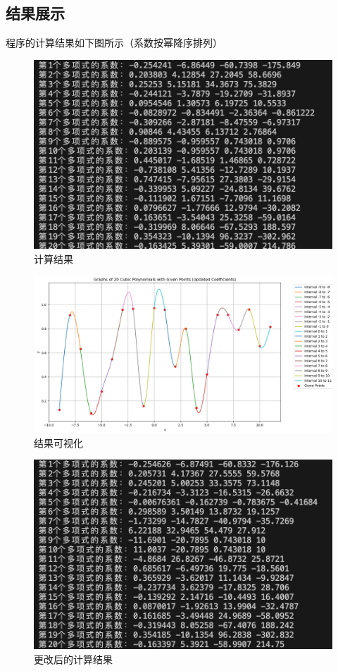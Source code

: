 \documentclass[UTF8]{ctexart}
\begin{document}
\subsection{结果展示}
程序的计算结果如下图所示（系数按幂降序排列）
\begin{figure}[H]
  \centering
  \includegraphics[scale=0.5]{res1.png}
  \caption{计算结果}
\end{figure}
\begin{figure}[H]
  \centering
  \includegraphics[scale=0.3]{Figure_1.png}
  \caption{结果可视化}
\end{figure}
\begin{figure}[H]
  \centering
  \includegraphics[scale=0.5]{res2.png}
  \caption{更改后的计算结果}
\end{figure}
\end{document}

